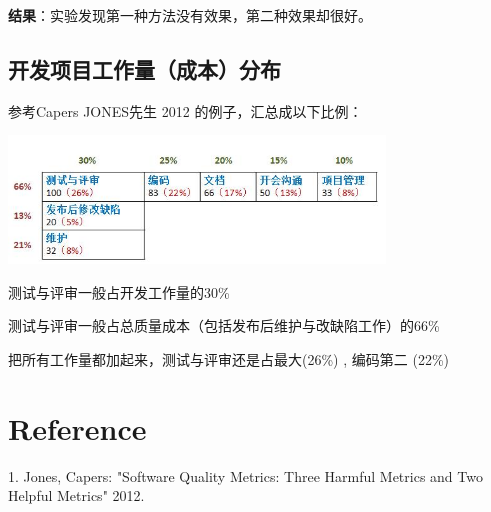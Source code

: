 \textbf{结果}：实验发现第一种方法没有效果，第二种效果却很好。

\hypertarget{ux5f00ux53d1ux9879ux76eeux5de5ux4f5cux91cfux6210ux672cux5206ux5e03}{%
\subsection{开发项目工作量（成本）分布}\label{ux5f00ux53d1ux9879ux76eeux5de5ux4f5cux91cfux6210ux672cux5206ux5e03}}

参考Capers JONES先生 2012 的例子，汇总成以下比例：


\includegraphics[width=10cm]{AR1成本占比.jpg}

测试与评审一般占开发工作量的30\%

测试与评审一般占总质量成本（包括发布后维护与改缺陷工作）的66\%

把所有工作量都加起来，测试与评审还是占最大(26\%) , 编码第二 (22\%)


\hypertarget{reference}{%
\section{Reference}\label{reference}}

1. Jones, Capers: "Software Quality Metrics: Three Harmful Metrics and
Two Helpful Metrics" 2012.\\


